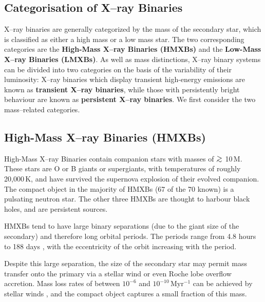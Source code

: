 
\subsection{Categorisation of X--ray Binaries}\label{cha:Introduction:sec:X--rayBinaries:subsec:CategorizationOfX--rayBinaries}

X--ray binaries are generally categorized by the mass of the
secondary star, which is classified as either a high mass or a low
mass star. The two corresponding categories are the \textbf{High-Mass
X--ray Binaries (HMXBs)} and the \textbf{Low-Mass X--ray Binaries (LMXBs)}. %
As well as mass distinctions, X--ray binary systems can be divided into
two categories on the basis of the variability of their luminosity: %
X--ray binaries which display transient high-energy emissions are known as
\textbf{transient X--ray binaries}, while those with persistently bright behaviour are known as
\textbf{persistent X--ray binaries}. We first consider the two mass--related categories. %


\subsection{High-Mass X--ray Binaries (HMXBs)}\label{cha:Introduction:sec:X--rayBinaries:subsec:HMXBs}

High-Mass X--ray Binaries contain companion stars with masses of $\gsim$
10\,M\sun. These stars are O or B giants or supergiants, %
with temperatures of roughly 20,000\,K, %
and have survived the supernova explosion of their evolved
companion. %
The compact object in the majority of HMXBs (67 of the 70 known) is a pulsating neutron
star.
The other three HMXBs are thought to harbour black holes, and are persistent sources. %

\vspace{\myparskip}

HMXBs tend to have large binary separations (due to the giant size of
the secondary) and therefore long orbital periods. The periods range from 4.8 hours to 188 days
\cite{VanParadijs:1995}, with the eccentricity of the orbit increasing with the period. %

\vspace{\myparskip}

Despite this large separation, the size of the secondary star may
permit mass transfer onto the primary via a stellar wind or even Roche lobe
overflow accretion. %
Mass loss rates of between $10^{-6}$ and $10^{-10}$\,M\sun $\mathrm{yr}^{-1}$ can be
achieved by stellar winds %
\cite{WhiteNagaseParmar:1995}, %
and the compact object captures a small fraction of this mass. %


